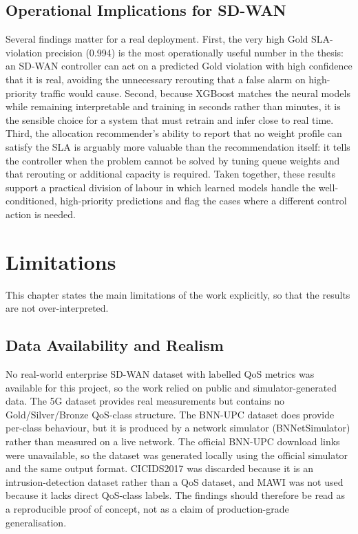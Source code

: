 \documentclass[a4paper,12pt]{Classes/RoboticsLaTeX}
\begin{document}
\section{Operational Implications for SD-WAN}

Several findings matter for a real deployment. First, the very high Gold SLA-violation precision (0.994) is the most operationally useful number in the thesis: an SD-WAN controller can act on a predicted Gold violation with high confidence that it is real, avoiding the unnecessary rerouting that a false alarm on high-priority traffic would cause. Second, because XGBoost matches the neural models while remaining interpretable and training in seconds rather than minutes, it is the sensible choice for a system that must retrain and infer close to real time. Third, the allocation recommender's ability to report that no weight profile can satisfy the SLA is arguably more valuable than the recommendation itself: it tells the controller when the problem cannot be solved by tuning queue weights and that rerouting or additional capacity is required. Taken together, these results support a practical division of labour in which learned models handle the well-conditioned, high-priority predictions and flag the cases where a different control action is needed.

\chapter{Limitations}
\label{chap:limitations}

This chapter states the main limitations of the work explicitly, so that the results are not over-interpreted.

\section{Data Availability and Realism}

No real-world enterprise SD-WAN dataset with labelled QoS metrics was available for this project, so the work relied on public and simulator-generated data. The 5G dataset provides real measurements but contains no Gold/Silver/Bronze QoS-class structure. The BNN-UPC dataset does provide per-class behaviour, but it is produced by a network simulator (BNNetSimulator) rather than measured on a live network. The official BNN-UPC download links were unavailable, so the dataset was generated locally using the official simulator and the same output format. CICIDS2017 was discarded because it is an intrusion-detection dataset rather than a QoS dataset, and MAWI was not used because it lacks direct QoS-class labels. The findings should therefore be read as a reproducible proof of concept, not as a claim of production-grade generalisation.
\end{document}
